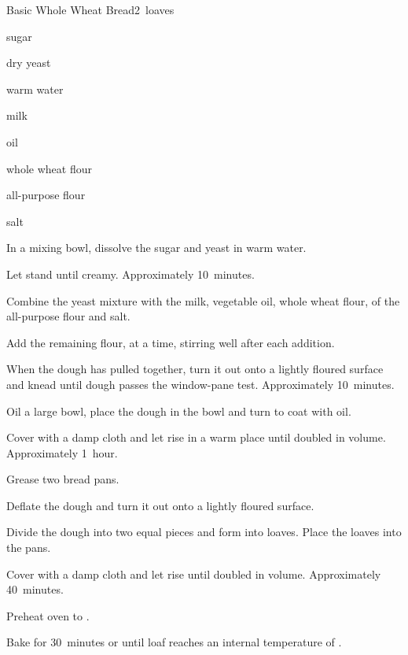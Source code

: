 \begin{recipe}{Basic Whole Wheat Bread}{}{2~loaves}

\begin{ingredients}
\item {} sugar
\item {} dry yeast
\item \C{\threequarter} warm water
\item \C{\quarter} milk
\item {} oil
\item {} whole wheat flour
\item {} all-purpose flour
\item {} salt
\end{ingredients}

\begin{directions}
\item In a mixing bowl, dissolve the sugar and yeast in warm water.
\item Let stand until creamy. Approximately 10~minutes.
\item Combine the yeast mixture with the milk, vegetable oil, whole wheat flour,  of the all-purpose flour and salt.
\item Add the remaining flour, \C{\half} at a time, stirring well after each addition.
\item When the dough has pulled together, turn it out onto a lightly floured surface and knead until dough passes the window-pane test. Approximately 10~minutes.
\item Oil a large bowl, place the dough in the bowl and turn to coat with oil.
\item Cover with a damp cloth and let rise in a warm place until doubled in volume. Approximately 1~hour.
\item Grease two bread pans.
\item Deflate the dough and turn it out onto a lightly floured surface.
\item Divide the dough into two equal pieces and form into loaves. Place the loaves into the pans.
\item Cover with a damp cloth and let rise until doubled in volume. Approximately 40~minutes.
\item Preheat oven to .
\item Bake for 30~minutes or until loaf reaches an internal temperature of .
\end{directions}
\end{recipe}
